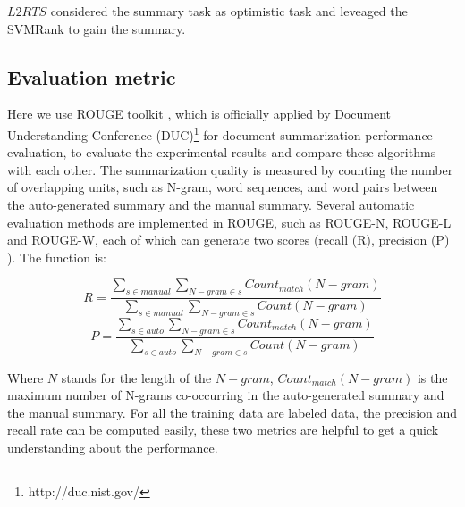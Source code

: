 \documentclass{acm_proc_article-sp}
\begin{document}
$L2RTS$ considered the summary task as optimistic task and  leveaged the SVMRank to gain the summary.

\subsection{Evaluation metric}

Here we use ROUGE toolkit \cite{2004-Lin-p74-81} , which is officially applied by Document Understanding Conference (DUC)\footnote{http://duc.nist.gov/} for document summarization performance evaluation, to evaluate the experimental results and compare these algorithms with each other. 
The summarization quality is measured by counting the number of overlapping units, such as N-gram, word sequences, and word pairs between the auto-generated summary and the manual summary. 
Several automatic evaluation methods are implemented in ROUGE, such as ROUGE-N, ROUGE-L and ROUGE-W, each of which can generate two scores (recall (R), precision (P) %
). The function is:

\begin{equation}
R=\frac{\sum_{s \in manual } \sum_{N-gram \in s} Count_{match}(N-gram) } { \sum_{s \in manual} \sum_{N-gram \in s} Count(N-gram)  } \end{equation}
\begin{equation}
P=\frac{\sum_{s \in auto } \sum_{N-gram \in s} Count_{match}(N-gram) } { \sum_{s \in auto} \sum_{N-gram \in s} Count(N-gram)  }
\end{equation}


Where $N$ stands for the length of the $N-gram$, $Count_{match}(N-gram)$ is the maximum number of N-grams co-occurring in the auto-generated summary and the manual summary. For all the training data are labeled data, the precision and recall rate can be computed easily, these two metrics are helpful to get a quick understanding about the performance.




\end{document}
